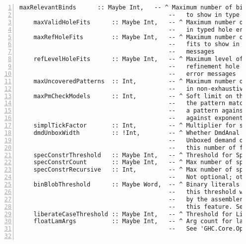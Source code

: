 \documentclass[en]{pracamgr}
\begin{document}
\begin{lstlisting}[numbers=left,stepnumber=1]
    maxRelevantBinds      :: Maybe Int,   -- ^ Maximum number of bindings from the type envt
                                          --   to show in type error messages
    maxValidHoleFits      :: Maybe Int,   -- ^ Maximum number of hole fits to show
                                          --   in typed hole error messages
    maxRefHoleFits        :: Maybe Int,   -- ^ Maximum number of refinement hole
                                          --   fits to show in typed hole error
                                          --   messages
    refLevelHoleFits      :: Maybe Int,   -- ^ Maximum level of refinement for
                                          --   refinement hole fits in typed hole
                                          --   error messages
    maxUncoveredPatterns  :: Int,         -- ^ Maximum number of unmatched patterns to show
                                          --   in non-exhaustiveness warnings
    maxPmCheckModels      :: Int,         -- ^ Soft limit on the number of models
                                          --   the pattern match checker checks
                                          --   a pattern against. A safe guard
                                          --   against exponential blow-up.
    simplTickFactor       :: Int,         -- ^ Multiplier for simplifier ticks
    dmdUnboxWidth         :: !Int,        -- ^ Whether DmdAnal should optimistically put an
                                          --   Unboxed demand on returned products with at most
                                          --   this number of fields
    specConstrThreshold   :: Maybe Int,   -- ^ Threshold for SpecConstr
    specConstrCount       :: Maybe Int,   -- ^ Max number of specialisations for any one function
    specConstrRecursive   :: Int,         -- ^ Max number of specialisations for recursive types
                                          --   Not optional; otherwise ForceSpecConstr can diverge.
    binBlobThreshold      :: Maybe Word,  -- ^ Binary literals (e.g. strings) whose size is above
                                          --   this threshold will be dumped in a binary file
                                          --   by the assembler code generator. 0 and Nothing disables
                                          --   this feature. See 'GHC.StgToCmm.Config'.
    liberateCaseThreshold :: Maybe Int,   -- ^ Threshold for LiberateCase
    floatLamArgs          :: Maybe Int,   -- ^ Arg count for lambda floating
                                          --   See 'GHC.Core.Opt.Monad.FloatOutSwitches'
  

\end{lstlisting}
\end{document}
